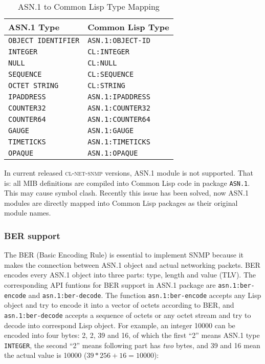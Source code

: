 \documentclass[reprint,9pt]{sigplanconf}
\begin{document}
\begin{table}
  \centering
  \caption{ASN.1 to Common Lisp Type Mapping}
  \label{table:asn.1-type-mapping}
  \begin{tabular}{|l|l|}
    \hline
    \textbf{ASN.1 Type} & \textbf{Common Lisp Type}\\
    \hline
    \texttt{OBJECT IDENTIFIER} & \texttt{ASN.1:OBJECT-ID}\\
    \texttt{INTEGER} & \texttt{CL:INTEGER}\\
    \texttt{NULL} & \texttt{CL:NULL}\\
    \texttt{SEQUENCE} & \texttt{CL:SEQUENCE}\\
    \texttt{OCTET STRING} & \texttt{CL:STRING}\\
    \texttt{IPADDRESS} & \texttt{ASN.1:IPADDRESS}\\
    \texttt{COUNTER32} & \texttt{ASN.1:COUNTER32}\\
    \texttt{COUNTER64} & \texttt{ASN.1:COUNTER64}\\
    \texttt{GAUGE} & \texttt{ASN.1:GAUGE}\\
    \texttt{TIMETICKS} & \texttt{ASN.1:TIMETICKS}\\
    \texttt{OPAQUE} & \texttt{ASN.1:OPAQUE}\\
    \hline
  \end{tabular}
\end{table}

In current released \textsc{cl-net-snmp} versions, ASN.1 module is not
supported. That is: all MIB definitions are compiled into Common Lisp
code in package \texttt{ASN.1}. This may cause symbol clash. Recently this
issue has been solved, now ASN.1 modules are directly mapped into
Common Lisp packages as their original module names.

\subsubsection{BER support}

The BER (Basic Encoding Rule) \cite{ISO:BER} is
essential to implement SNMP because it makes the connection between
ASN.1 object and actual networking packets. BER encodes
every ASN.1 object into three parts: type, length and value (TLV).
The corresponding API funtions for
BER support in ASN.1 package are \texttt{asn.1:ber-encode} and
\texttt{asn.1:ber-decode}. The function \texttt{asn.1:ber-encode} accepts
any Lisp object and try to encode it into a vector of octets
according to BER, and \texttt{asn.1:ber-decode} accepts
a sequence of octets or any octet stream and try to decode into
correspond Lisp object. For example, an integer 10000 can be
encoded into four bytes: 2, 2, 39 and 16, of which the first ``2''
means ASN.1 type \texttt{INTEGER}, the second ``2'' means following
part has \textsl{two} bytes, and 39 and 16 mean the actual value
is 10000 ($39*256+16 = 10000$):
\end{document}
